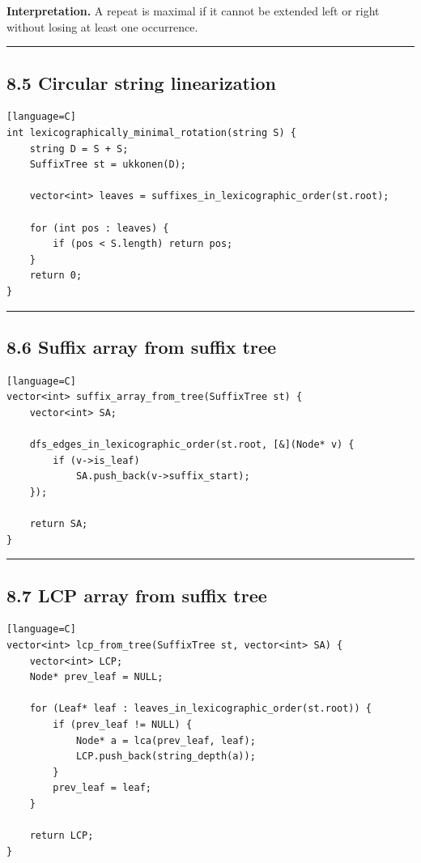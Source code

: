 \documentclass[11pt]{article}
\begin{document}
\textbf{Interpretation.} A repeat is maximal if it cannot be extended left or right without losing at least one occurrence.

\begin{center}\rule{0.5\linewidth}{0.5pt}\end{center}

\subsection{8.5 Circular string linearization}\label{circular-string-linearization}

\begin{verbatim}[language=C]
int lexicographically_minimal_rotation(string S) {
    string D = S + S;
    SuffixTree st = ukkonen(D);

    vector<int> leaves = suffixes_in_lexicographic_order(st.root);

    for (int pos : leaves) {
        if (pos < S.length) return pos;
    }
    return 0;
}
\end{verbatim}

\begin{center}\rule{0.5\linewidth}{0.5pt}\end{center}

\subsection{8.6 Suffix array from suffix tree}\label{suffix-array-from-suffix-tree}

\begin{verbatim}[language=C]
vector<int> suffix_array_from_tree(SuffixTree st) {
    vector<int> SA;

    dfs_edges_in_lexicographic_order(st.root, [&](Node* v) {
        if (v->is_leaf)
            SA.push_back(v->suffix_start);
    });

    return SA;
}
\end{verbatim}

\begin{center}\rule{0.5\linewidth}{0.5pt}\end{center}

\subsection{8.7 LCP array from suffix tree}\label{lcp-array-from-suffix-tree}

\begin{verbatim}[language=C]
vector<int> lcp_from_tree(SuffixTree st, vector<int> SA) {
    vector<int> LCP;
    Node* prev_leaf = NULL;

    for (Leaf* leaf : leaves_in_lexicographic_order(st.root)) {
        if (prev_leaf != NULL) {
            Node* a = lca(prev_leaf, leaf);
            LCP.push_back(string_depth(a));
        }
        prev_leaf = leaf;
    }

    return LCP;
}
\end{verbatim}
\end{document}
